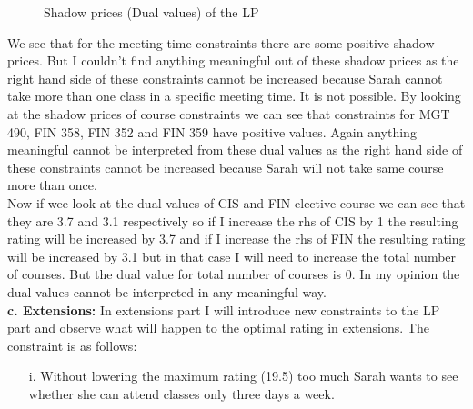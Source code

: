 \documentclass[paper=letter, fontsize=11pt]{scrartcl} %
\begin{document}
\begin{figure}[H]
  
  \centering
    \caption{Shadow prices (Dual values) of the LP}
\end{figure}
We see that for the meeting time constraints there are some positive shadow prices. But I couldn't find anything meaningful out of these shadow prices as the right hand side of these constraints cannot be increased because Sarah cannot take more than one class in a specific meeting time. It is not possible. By looking at the shadow prices of course constraints we can see that constraints for MGT 490, FIN 358, FIN 352 and FIN 359 have positive values. Again anything meaningful cannot be interpreted from these dual values as the right hand side of these constraints cannot be increased because Sarah will not take same course more than once.\\
Now if wee look at the dual values of CIS and FIN elective course we can see that they are 3.7 and 3.1 respectively so if I increase the rhs of CIS by 1 the resulting rating will be increased by 3.7 and if I increase the rhs of FIN the resulting rating will be increased by 3.1 but in that case I will need to increase the total number of courses. But the dual value for total number of courses is 0. In my opinion the dual values cannot be interpreted in any meaningful way.\\  

 \normalsize \textbf{c. Extensions:}
In extensions part I will introduce new constraints to the LP part and observe what will happen to the optimal rating in extensions. The constraint is as follows:
\begin{enumerate}[align=left,style=nextline,leftmargin=1.5cm,labelsep=\parindent,font=\normalfont]
\item[i.]  Without lowering the maximum rating (19.5) too much Sarah wants to see whether she can attend classes only three days a week. 
\end{enumerate}
\end{document}
